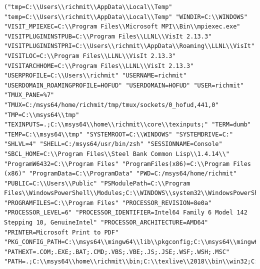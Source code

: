 \documentclass[11pt]{article}
\begin{document}
\begin{verbatim}
("tmp=C:\\Users\\richmit\\AppData\\Local\\Temp" "temp=C:\\Users\\richmit\\AppData\\Local\\Temp" "WINDIR=C:\\WINDOWS" "VISIT_MPIEXEC=C:\\Program Files\\Microsoft MPI\\Bin\\mpiexec.exe" "VISITPLUGININSTPUB=C:\\Program Files\\LLNL\\VisIt 2.13.3" "VISITPLUGININSTPRI=C:\\Users\\richmit\\AppData\\Roaming\\LLNL\\VisIt" "VISITLOC=C:\\Program Files\\LLNL\\VisIt 2.13.3" "VISITARCHHOME=C:\\Program Files\\LLNL\\VisIt 2.13.3" "USERPROFILE=C:\\Users\\richmit" "USERNAME=richmit" "USERDOMAIN_ROAMINGPROFILE=HOFUD" "USERDOMAIN=HOFUD" "USER=richmit" "TMUX_PANE=%7" "TMUX=C:/msys64/home/richmit/tmp/tmux/sockets/0_hofud,441,0" "TMP=C:\\msys64\\tmp" "TEXINPUTS=.;C:\\msys64\\home\\richmit\\core\\texinputs;" "TERM=dumb" "TEMP=C:\\msys64\\tmp" "SYSTEMROOT=C:\\WINDOWS" "SYSTEMDRIVE=C:" "SHLVL=4" "SHELL=C:/msys64/usr/bin/zsh" "SESSIONNAME=Console" "SBCL_HOME=C:\\Program Files\\Steel Bank Common Lisp\\1.4.14\\" "ProgramW6432=C:\\Program Files" "ProgramFiles(x86)=C:\\Program Files (x86)" "ProgramData=C:\\ProgramData" "PWD=C:/msys64/home/richmit" "PUBLIC=C:\\Users\\Public" "PSModulePath=C:\\Program Files\\WindowsPowerShell\\Modules;C:\\WINDOWS\\system32\\WindowsPowerShell\\v1.0\\Modules" "PROGRAMFILES=C:\\Program Files" "PROCESSOR_REVISION=8e0a" "PROCESSOR_LEVEL=6" "PROCESSOR_IDENTIFIER=Intel64 Family 6 Model 142 Stepping 10, GenuineIntel" "PROCESSOR_ARCHITECTURE=AMD64" "PRINTER=Microsoft Print to PDF" "PKG_CONFIG_PATH=C:\\msys64\\mingw64\\lib\\pkgconfig;C:\\msys64\\mingw64\\share\\pkgconfig" "PATHEXT=.COM;.EXE;.BAT;.CMD;.VBS;.VBE;.JS;.JSE;.WSF;.WSH;.MSC" "PATH=.;C:\\msys64\\home\\richmit\\bin;C:\\texlive\\2018\\bin\\win32;C:\\msys64\\mingw64\\bin;C:\\msys64\\mingw32\\bin;C:\\msys64\\u
\end{verbatim}
\end{document}
